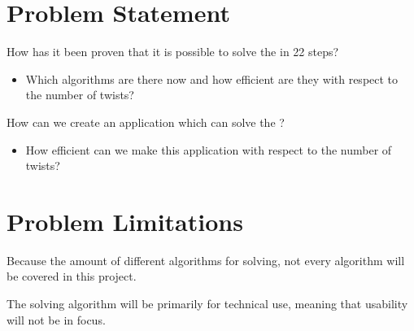 



\section{Problem Statement}
How has it been proven that it is possible to solve the \rubik{} in 22 steps?
\begin{itemize}
	\item Which algorithms are there now and how efficient are they with respect to the number of twists?
\end{itemize}
How can we create an application which can solve the \rubik{}?
\begin{itemize}
	\item How efficient can we make this application with respect to the number of twists?
\end{itemize}

\section{Problem Limitations}
Because the amount of different algorithms for \rubik{} solving, not every algorithm will be covered in this project.

The \rubik{} solving algorithm will be primarily for technical use, meaning that usability will not be in focus.